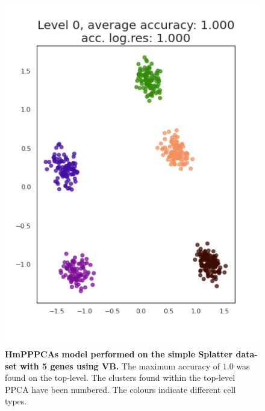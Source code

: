 \begin{figure}
    \centering
    \includegraphics[width=.6\linewidth]{figs/simple_5_vb.png}
    \caption[HmPPPCAs model performed on the simple Splatter data-set with 5 genes using VB]{\small \textbf{HmPPPCAs model performed on the simple Splatter data-set with 5 genes using VB.} \small The maximum accuracy of $1.0$ was found on the top-level. The clusters found within the top-level PPCA have been numbered. The colours indicate different cell types.}
    \label{fig:simple_5_vb}
\end{figure}

